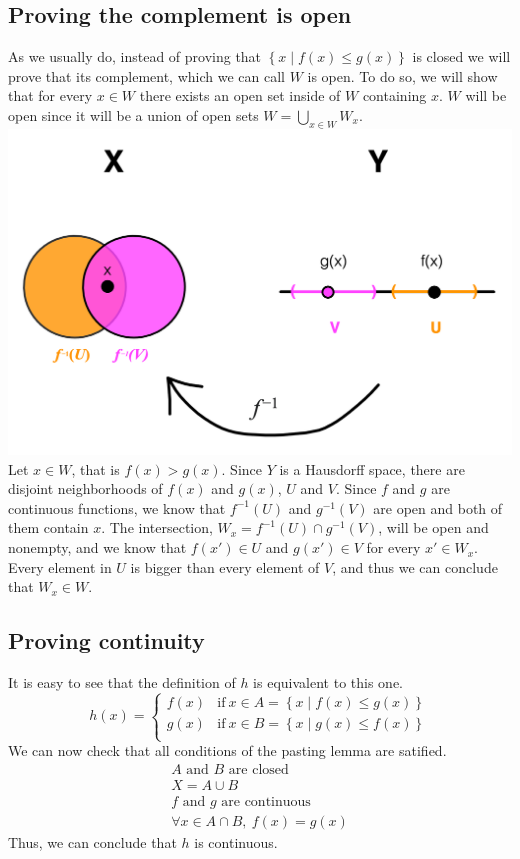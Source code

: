 \documentclass{article}
\begin{document}
\subsection*{Proving the complement is open}
As we usually do, instead of proving that $\left\{x \mid f(x) \leq g(x)\right\}$ is closed we will prove that its complement, which we can call $W$ is open. To do so, we will show that for every $x \in W$ there exists an open set inside of $W$ containing $x$. $W$ will be open since it will be a union of open sets $W = \bigcup\limits_{x \in W}W_x$. 
\\
\includegraphics[width=\textwidth]{diagram.png}
Let $x \in W$, that is $f(x) > g(x)$. Since $Y$ is a Hausdorff space, there are disjoint neighborhoods of $f(x)$ and $g(x)$, $U$ and $V$. Since $f$ and $g$ are continuous functions, we know that $f^{-1}(U)$ and $g^{-1}(V)$ are open and both of them contain $x$. The intersection, $W_x = f^{-1}(U) \cap g^{-1}(V)$, will be open and nonempty, and we know that $f(x') \in U$ and $g(x') \in V$ for every $x' \in W_x$. Every element in $U$ is bigger than every element of $V$, and thus we can conclude that $W_x \in W$.
\subsection*{Proving continuity}
It is easy to see that the definition of $h$ is equivalent to this one.
\begin{equation*}
    h(x) = \left\{
        \begin{array}{ll}
        f(x) & \mathrm{if\ } x \in A = \left\{x \mid f(x) \leq g(x)\right\} \\
        g(x) & \mathrm{if\ } x \in B = \left\{x \mid g(x) \leq f(x)\right\} \\
        \end{array}
    \right.
\end{equation*}
We can now check that all conditions of the pasting lemma are satified.
\begin{gather*}
    \text{$A$ and $B$ are closed} \\
    X = A \cup B  \\
    \text{$f$ and $g$ are continuous} \\
    \forall x \in A \cap B,\ f(x) = g(x)
\end{gather*}
Thus, we can conclude that $h$ is continuous.
\end{document}
